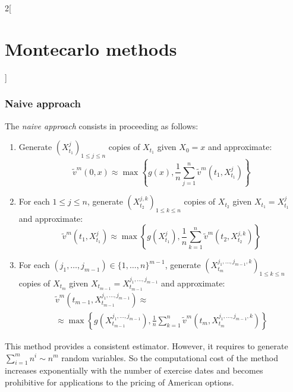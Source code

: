 \documentclass[../../../main_math.tex]{subfiles}
\begin{document}
\begin{multicols}{2}[\section{Montecarlo methods}]
  \subsubsection{Naive approach}
  \begin{definition}
    The \emph{naive approach} consists in proceeding as follows:
    \begin{enumerate}
      \item Generate ${(X_{t_1}^j)}_{1\leq j\leq n}$ \iid copies of $X_{t_1}$ given $X_0=x$ and approximate:
            $$
              \tilde{v}^m(0,x)\approx\max \left\{ g(x),\frac{1}{n}\sum_{j=1}^n \tilde{v}^m(t_1,X_{t_1}^j)\right\}
            $$
      \item For each $1\leq j\leq n$, generate ${(X_{t_2}^{j,k})}_{1\leq k\leq n}$ \iid copies of $X_{t_2}$ given $X_{t_1}=X_{t_1}^j$ and approximate:
            $$
              \tilde{v}^m(t_1,X_{t_1}^j)\approx\max \left\{ g(X_{t_1}^j),\frac{1}{n}\sum_{k=1}^n \tilde{v}^m(t_2,X_{t_2}^{j,k})\right\}
            $$
      \item For each ${(j_1,\ldots,j_{m-1})}\in{\{1,\ldots,n\}}^{m-1}$, generate ${(X_{t_m}^{j_1,\ldots,j_{m-1},k})}_{1\leq k\leq n}$ \iid copies of $X_{t_m}$ given $X_{t_{m-1}}=X_{t_{m-1}}^{j_1,\ldots,j_{m-1}}$ and approximate:
            \begin{multline*}
              \tilde{v}^m(t_{m-1},X_{t_{m-1}}^{j_1,\ldots,j_{m-1}})\approx\\\approx\max\! \left\{\! g(X_{t_{m-1}}^{j_1,\ldots,j_{m-1}}),\frac{1}{n}\sum_{k=1}^n\! \tilde{v}^m(t_m,X_{t_m}^{j_1,\ldots,j_{m-1},k})\!\right\}
            \end{multline*}
    \end{enumerate}
    \begin{remark}
      This method provides a consistent estimator. However, it requires to generate $\sum_{i=1}^mn^i\sim n^m$ random variables. So the computational cost of the method increases exponentially with the number of exercise dates and becomes prohibitive for applications to the pricing of American options.
    \end{remark}
  \end{definition}

\end{multicols}
\end{document}
